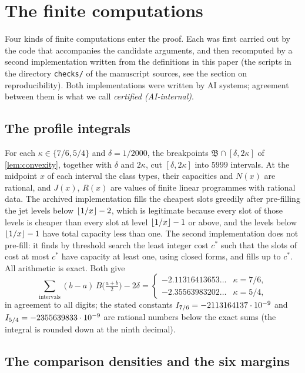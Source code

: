 \section{The finite computations}\label{app:certificates}

Four kinds of finite computations enter the proof. Each was first carried out by the code that
accompanies the candidate arguments, and then recomputed by a second implementation written
from the definitions in this paper (the scripts in the directory \texttt{checks/} of the
manuscript sources, see the section on reproducibility). Both implementations were written by AI
systems; agreement between them is what we call \emph{certified (AI-internal)}.

\subsection{The profile integrals}\label{app:profile-certificate}

For each $\kappa\in\{7/6,5/4\}$ and $\delta=1/2000$, the breakpoints $\mathfrak B\cap[\delta,2\kappa]$
of \cref{lem:convexity}, together with $\delta$ and $2\kappa$, cut $[\delta,2\kappa]$ into
$5999$ intervals. At the midpoint $x$ of each interval the class types, their capacities and $N(x)$
are rational, and $J(x)$, $R(x)$ are values of finite linear programmes with rational data. The
archived implementation fills the cheapest slots greedily after pre-filling the jet levels below
$\left\lfloor 1/x\right\rfloor-2$, which is legitimate because every slot of those levels is cheaper than every slot
at level $\left\lfloor 1/x\right\rfloor-1$ or above, and the levels below $\left\lfloor 1/x\right\rfloor-1$ have total capacity less
than one. The second implementation does not pre-fill: it finds by threshold search the least
integer cost $c^*$ such that the slots of cost at most $c^*$ have capacity at least one, using
closed forms, and fills up to $c^*$. All arithmetic is exact. Both give
\[
  \sum_{\text{intervals}}(b-a)\,B\bigl(\tfrac{a+b}2\bigr)-2\delta=
  \begin{cases}-2.11316413653\ldots&\kappa=7/6,\\
  -2.35563983202\ldots&\kappa=5/4,\end{cases}
\]
in agreement to all digits; the stated constants $I_{7/6}=-2113164137\cdot10^{-9}$ and
$I_{5/4}=-2355639833\cdot10^{-9}$ are rational numbers below the exact sums (the integral
is rounded down at the ninth decimal).

\subsection{The comparison densities and the six margins}\label{app:decay-certificates}

